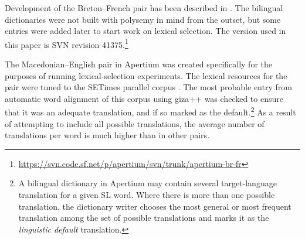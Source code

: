 \documentclass[11pt]{article}
\begin{document}
\begin{description}
\addtolength{\itemsep}{-0.10in}

\item[Breton--French:] Development of the Breton--French pair has been
  described in \citep{tyers10b}. The bilingual %
  dictionaries were not built with polysemy in mind from the outset,
  but some entries were added later to start work on lexical
  selection. The version used in this paper is SVN revision
  41375.\footnote{\url{https://svn.code.sf.net/p/apertium/svn/trunk/apertium-br-fr}}


\item[Macedonian--English:] The Macedonian--English pair
  in Apertium was created specifically for the purposes of running
  lexical-selection experiments. 
  The lexical resources for the pair were tuned to the SETimes parallel corpus
  \citep{tyers10}.  
  The most probable entry from automatic word alignment of this corpus
  using {\sc giza++} \citep{och03a} was checked to ensure that it was
  an adequate translation, and if so marked as the default.\footnote{A
    bilingual dictionary in Apertium \citep{forcada2011apertium} may
    contain several target-language translation for a given SL
    word. Where there is more than one possible translation, the
    dictionary writer chooses the most general or most frequent
    translation among the set of possible translations and marks it as
    the \emph{linguistic default} translation.} As a result of
  attempting to include all possible translations, the average number
  of translations per word is much
  higher %
  than in other pairs.

\end{description}
\end{document}
